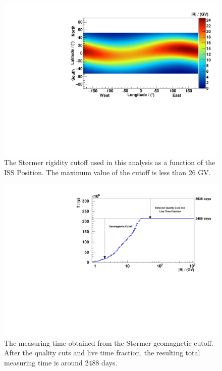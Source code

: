 \begin{figure}[hptb]
\centering
\includegraphics[width=1.0\textwidth, height=0.41\textheight]{Figures/chapter4/MeasuringTime/CutOffRigidityVsISSPosition.pdf}
\caption[The Størmer rigidity cutoff as a function of the ISS Position.]{The Størmer rigidity cutoff used in this analysis as a function of the ISS Position. The maximum value of the cutoff is less than 26 GV.}
\label{StormerCutOffRigidity}
\end{figure}


\begin{figure}[hptb]
\centering
\includegraphics[width=1.0\textwidth, height=0.41\textheight]{Figures/chapter4/MeasuringTime/Measuringtime.pdf}
\caption[The measuring time from the Størmer geomagnetic cutoff.]{The measuring time obtained from the Størmer geomagnetic cutoff. After the quality cuts and live time fraction, the resulting total measuring time is around 2488 days.}
\label{Measuringtime}
\end{figure}

